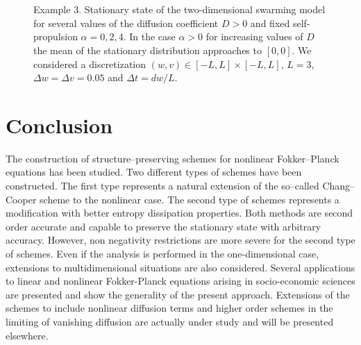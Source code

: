 \documentclass[a4paper]{article}
\theoremstyle{remark}\newtheorem{remark}{Remark}
\begin{document}
\begin{figure}
\centering
{}
\\
\\
\caption{{Example 3}. Stationary state of the two-dimensional swarming model for several values of the diffusion coefficient $D>0$ and fixed self-propulsion $\alpha=0,2,4$. In the case $\alpha>0$ for increasing values of $D$ the mean of the stationary distribution approaches to $[0,0]$. We considered a discretization $(w,v)\in[-L,L]\times[-L,L]$, $L=3$, $\Delta w=\Delta v=0.05$ and $\Delta t = dw/L$.}
\label{fig:2D_swarming}
\end{figure}

\section*{Conclusion}
The construction of structure--preserving schemes for nonlinear Fokker--Planck equations has been studied.  Two different types of schemes have been constructed. The first type represents a natural extension of the so--called Chang--Cooper scheme to the nonlinear case. The second type of schemes represents a modification with better entropy dissipation properties. 
Both methods are second order accurate and capable to preserve the stationary state with arbitrary accuracy.
However, non negativity restrictions are more severe for the second type of schemes. 
Even if the analysis is performed in the one-dimensional case, extensions to multidimensional situations are also considered. Several applications to linear and nonlinear Fokker-Planck equations arising in socio-economic sciences are presented and show the generality of the present approach. Extensions of the schemes to include nonlinear diffusion terms and higher order schemes in the limiting of vanishing diffusion are actually under study and will be presented elsewhere.    
\end{document}
